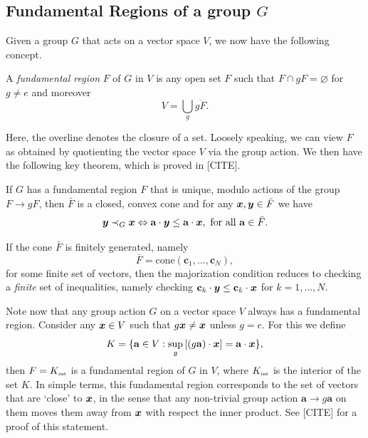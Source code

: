 \documentclass[pra,
aps,
twocolumn,
superscriptaddress,
groupedaddress,
nofootinbib,
reprint
]{revtex4-1}
\begin{document}
\subsection{Fundamental Regions of a group $G$}
Given a group $G$ that acts on a vector space $V$, we now have the following concept.
\begin{definition} A \emph{fundamental region} $F$ of $G$ in $V$ is any open set $F$ such that $F \cap gF = \varnothing$ for $g \ne e$ and moreover 
\begin{equation}
V = \bigcup_{g} \overline{g F}.
\end{equation}
\end{definition}
Here, the overline denotes the closure of a set. Loosely speaking, we can view $F$ as obtained by quotienting the vector space $V$ via the group action. We then have the following key theorem, which is proved in [CITE].
\begin{theorem} If $G$ has a fundamental region $F$ that is unique, modulo actions of the group $F\rightarrow gF$, then $\bar{F}$ is a closed, convex cone and for any $\boldsymbol{x}, \boldsymbol{y} \in \bar{F}$ we have
\begin{equation}
\boldsymbol{y} \prec_G \boldsymbol{x} \Leftrightarrow \mathbf{a}\cdot \boldsymbol{y} \le \mathbf{a} \cdot \boldsymbol{x}, \mbox{ for all } \mathbf{a} \in \bar{F}.
\end{equation}
\end{theorem}
If the cone $\bar{F}$ is finitely generated, namely 
\begin{equation}
\bar{F} = \mbox{cone}( \mathbf{c}_1, \dots, \mathbf{c}_N),
\end{equation}
for some finite set of vectors, then the majorization condition reduces to checking a \emph{finite} set of inequalities, namely checking $\mathbf{c}_k \cdot \boldsymbol{y} \le \mathbf{c}_k \cdot \boldsymbol{x}$ for $k=1, \dots , N$.

Note now that any group action $G$ on a vector space $V$ always has a fundamental region. Consider any $\boldsymbol{x} \in V$ such that $g \boldsymbol{x} \ne \boldsymbol{x}$ unless $g =e$. For this we define
\begin{equation}
K = \{ \mathbf{a} \in V : \sup_g \left [ (g\mathbf{a})\cdot \boldsymbol{x} \right ] = \mathbf{a} \cdot \boldsymbol{x} \},
\end{equation}
then $F = K_{\mbox{\tiny int}}$ is a fundamental region of $G$ in $V$, where $ K_{\mbox{\tiny int}}$ is the interior of the set $K$. In simple terms, this fundamental region corresponds to the set of vectors that are `close' to $\boldsymbol{x}$, in the sense that any non-trivial group action $\mathbf{a} \rightarrow g \mathbf{a}$ on them moves them away from $\boldsymbol{x}$ with respect the inner product. See [CITE] for a proof of this statement.
\end{document}
